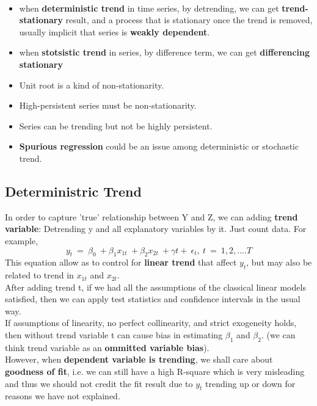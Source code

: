 \documentclass[12pt]{article}
\begin{document}
\noindent
\color{purple} \\
\color{black}
\begin{itemize}
\item
when \textbf{deterministic trend} in time series, by detrending, we can get \textbf{trend-stationary} result, and a process that is stationary once the trend is removed, usually implicit that series is \textbf{weakly dependent}. 
\item
when \textbf{stotsistic trend} in series, by difference term, we can get \textbf{differencing stationary}
\item
Unit root is a kind of non-stationarity. 
\item
High-persistent series must be non-stationarity. 
\item
Series can be trending but not be highly persistent.
\item
\textbf{Spurious regression} could be an issue among deterministic or stochastic trend.








\end{itemize}



\newpage
{\color{RoyalBlue}
\subsection{Deterministric Trend}}
In order to capture 'true' relationship between Y and Z, we can adding \textbf{trend variable}: Detrending y and all explanatory variables by it. Just count data. For example, 
$$y_t\ =\ \beta_0\ +\beta_1x_{1t}\ +\beta_2x_{2t}\ + \gamma t +\ \epsilon_t,\ t\ =\ 1,2,....T$$
This equation allow as to control for \textbf{linear trend} that affect $y_t$, but may also be related to trend in $x_{1t}$ and $x_{2t}$.
\\

After adding trend t, if we had all the assumptions of the classical linear models satisfied, then we can apply test statistics and confidence intervals in the usual way.\\

If assumptions of linearity, no perfect collinearity, and strict exogeneity holds, then without trend variable t can cause bias in estimating $\beta_1$ and $\beta_2$. (we can think trend variable as an \textbf{ommitted variable bias}).\\

However, when \textbf{dependent variable is trending}, we shall care about \textbf{goodness of fit}, i.e. we can still have a high R-square which is very misleading and thus we should not credit the fit result due to $y_t$ trending up or down for reasons we have not explained.
\\
\end{document}
